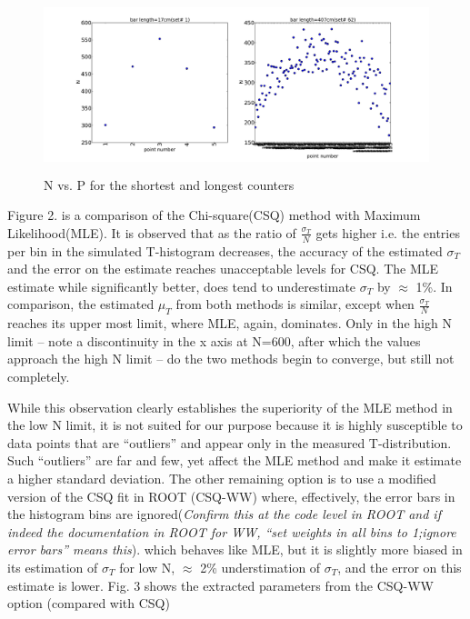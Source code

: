 \documentclass[12pt]{article}
\begin{document}
\begin{figure}[ht]
	\includegraphics[height=2in,width=5in]{bar_stats_write-up_N-vs-p.pdf}
	\caption{N vs. P for the shortest and longest counters}
	\label{fig1}
\end{figure}

Figure 2. is a comparison of the Chi-square(CSQ) method with Maximum Likelihood(MLE). It is observed that as the ratio of $\frac{\sigma_{T}}{N}$ gets higher i.e. the entries per bin in the simulated T-histogram decreases, the accuracy of the estimated $\sigma_{T}$ and the error on the estimate reaches unacceptable levels for CSQ. The MLE estimate while significantly better, does tend to underestimate $\sigma_{T}$ by $\approx$ 1\%. In comparison, the estimated $\mu_{T}$ from both methods is similar, except when $\frac{\sigma_{T}}{N}$ reaches its upper most limit, where MLE, again, dominates. Only in the high N limit -- note a discontinuity in the x axis at N=600, after which the values approach the high N limit -- do the two methods begin to converge, but still not completely.

While this observation clearly establishes the superiority of the MLE method in the low N limit, it is not suited for our purpose because it is highly susceptible to data points that are ``outliers'' and appear only in the measured T-distribution. Such ``outliers'' are far and few, yet affect the MLE method and make it estimate a higher standard deviation. The other remaining option is to use a modified version of the CSQ fit in ROOT (CSQ-WW) where, effectively, the error bars in the histogram bins are ignored(\textit{Confirm this at the code level in ROOT and if indeed the documentation in ROOT for WW, ``set weights in all bins to 1;ignore error bars'' means this}). which behaves like MLE, but it is slightly more biased in its estimation of $\sigma_{T}$ for low N, $\approx$ 2\% understimation of $\sigma_{T}$, and the error on this estimate is lower. Fig. 3 shows the extracted parameters from the CSQ-WW option (compared with CSQ)
\end{document}
